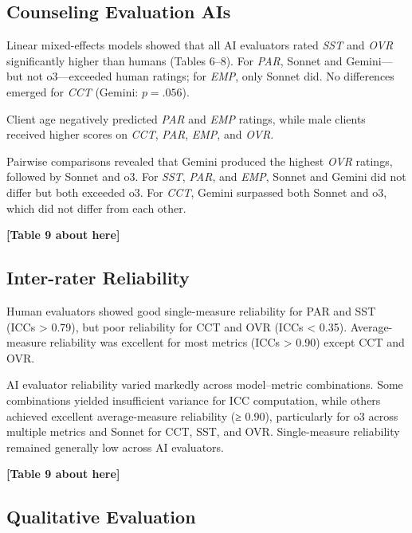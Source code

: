 \documentclass{wiley-article}
\begin{document}
\subsection*{Counseling Evaluation AIs}

Linear mixed-effects models showed that all AI evaluators rated \textit{SST} and \textit{OVR} significantly higher than humans (Tables 6–8). For \textit{PAR}, Sonnet and Gemini—but not o3—exceeded human ratings; for \textit{EMP}, only Sonnet did. No differences emerged for \textit{CCT} (Gemini: $p = .056$).

Client age negatively predicted \textit{PAR} and \textit{EMP} ratings, while male clients received higher scores on \textit{CCT}, \textit{PAR}, \textit{EMP}, and \textit{OVR}.

Pairwise comparisons revealed that Gemini produced the highest \textit{OVR} ratings, followed by Sonnet and o3. For \textit{SST}, \textit{PAR}, and \textit{EMP}, Sonnet and Gemini did not differ but both exceeded o3. For \textit{CCT}, Gemini surpassed both Sonnet and o3, which did not differ from each other.


\begin{center}
\textbf{[Table 9 about here]}
\end{center}

\subsection*{Inter-rater Reliability}

Human evaluators showed good single-measure reliability for PAR and SST (ICCs > 0.79), but poor reliability for CCT and OVR (ICCs < 0.35). Average-measure reliability was excellent for most metrics (ICCs > 0.90) except CCT and OVR.

AI evaluator reliability varied markedly across model–metric combinations. Some combinations yielded insufficient variance for ICC computation, while others achieved excellent average-measure reliability (≥ 0.90), particularly for o3 across multiple metrics and Sonnet for CCT, SST, and OVR. Single-measure reliability remained generally low across AI evaluators.


\begin{center}
\textbf{[Table 9 about here]}
\end{center}

\subsection*{Qualitative Evaluation}
\end{document}
